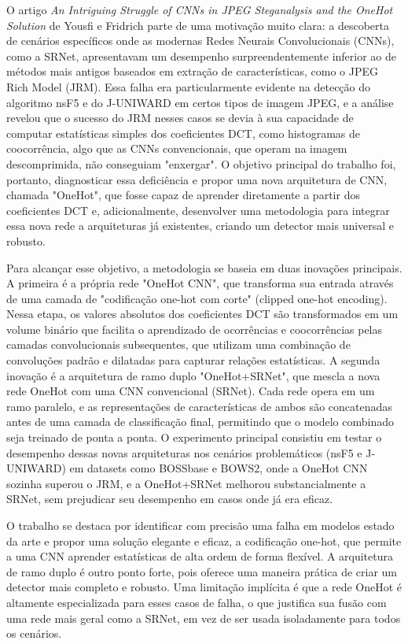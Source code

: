 \documentclass[12pt]{article}
\begin{document}
O artigo \textit{An Intriguing Struggle of CNNs in JPEG Steganalysis
and the OneHot Solution} de Yousfi e Fridrich \cite{fridrichOnehot} parte de uma motivação muito clara: a descoberta de cenários específicos onde as modernas Redes Neurais Convolucionais (CNNs), como a SRNet, apresentavam um desempenho surpreendentemente inferior ao de métodos mais antigos baseados em extração de características, como o JPEG Rich Model (JRM). Essa falha era particularmente evidente na detecção do algoritmo nsF5 e do J-UNIWARD em certos tipos de imagem JPEG, e a análise revelou que o sucesso do JRM nesses casos se devia à sua capacidade de computar estatísticas simples dos coeficientes DCT, como histogramas de coocorrência, algo que as CNNs convencionais, que operam na imagem descomprimida, não conseguiam "enxergar". O objetivo principal do trabalho foi, portanto, diagnosticar essa deficiência e propor uma nova arquitetura de CNN, chamada "OneHot", que fosse capaz de aprender diretamente a partir dos coeficientes DCT e, adicionalmente, desenvolver uma metodologia para integrar essa nova rede a arquiteturas já existentes, criando um detector mais universal e robusto.

Para alcançar esse objetivo, a metodologia se baseia em duas inovações principais. A primeira é a própria rede "OneHot CNN", que transforma sua entrada através de uma camada de "codificação one-hot com corte" (clipped one-hot encoding). Nessa etapa, os valores absolutos dos coeficientes DCT são transformados em um volume binário que facilita o aprendizado de ocorrências e coocorrências pelas camadas convolucionais subsequentes, que utilizam uma combinação de convoluções padrão e dilatadas para capturar relações estatísticas. A segunda inovação é a arquitetura de ramo duplo "OneHot+SRNet", que mescla a nova rede OneHot com uma CNN convencional (SRNet). Cada rede opera em um ramo paralelo, e as representações de características de ambos são concatenadas antes de uma camada de classificação final, permitindo que o modelo combinado seja treinado de ponta a ponta. O experimento principal consistiu em testar o desempenho dessas novas arquiteturas nos cenários problemáticos (nsF5 e J-UNIWARD) em datasets como BOSSbase e BOWS2, onde a OneHot CNN sozinha superou o JRM, e a OneHot+SRNet melhorou substancialmente a SRNet, sem prejudicar seu desempenho em casos onde já era eficaz.

O trabalho se destaca por identificar com precisão uma falha em modelos estado da arte e propor uma solução elegante e eficaz, a codificação one-hot, que permite a uma CNN aprender estatísticas de alta ordem de forma flexível. A arquitetura de ramo duplo é outro ponto forte, pois oferece uma maneira prática de criar um detector mais completo e robusto. Uma limitação implícita é que a rede OneHot é altamente especializada para esses casos de falha, o que justifica sua fusão com uma rede mais geral como a SRNet, em vez de ser usada isoladamente para todos os cenários.
\end{document}
